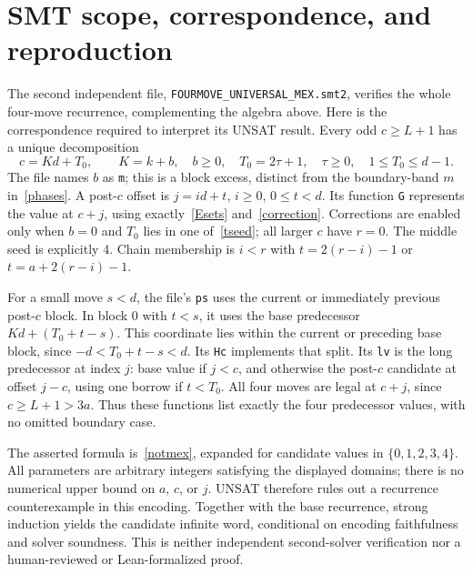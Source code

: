 \documentclass[10pt,a4paper]{article}
\begin{document}
\section{SMT scope, correspondence, and reproduction}
The second independent file, \texttt{FOURMOVE\_UNIVERSAL\_MEX.smt2}, verifies the whole four-move recurrence, complementing the algebra above. Here is the correspondence required to interpret its UNSAT result.
Every odd $c\ge L+1$ has a unique decomposition
\[
 c=Kd+T_0,\qquad K=k+b,\quad b\ge0,\quad T_0=2\tau+1,\quad \tau\ge0,\quad 1\le T_0\le d-1.
\]
The file names $b$ as \texttt{m}; this is a block excess, distinct from the boundary-band $m$ in~\eqref{phases}. A post-$c$ offset is $j=id+t$, $i\ge0$, $0\le t<d$. Its function \texttt{G} represents the value at $c+j$, using exactly~\eqref{Esets} and~\eqref{correction}. Corrections are enabled only when $b=0$ and $T_0$ lies in one of~\eqref{tseed}; all larger $c$ have $r=0$. The middle seed is explicitly 4. Chain membership is $i<r$ with $t=2(r-i)-1$ or $t=a+2(r-i)-1$.

For a small move $s<d$, the file's \texttt{ps} uses the current or immediately previous post-$c$ block. In block 0 with $t<s$, it uses the base predecessor $Kd+(T_0+t-s)$. This coordinate lies within the current or preceding base block, since $-d<T_0+t-s<d$. Its \texttt{Hc} implements that split. Its \texttt{lv} is the long predecessor at index $j$: base value if $j<c$, and otherwise the post-$c$ candidate at offset $j-c$, using one borrow if $t<T_0$. All four moves are legal at $c+j$, since $c\ge L+1>3a$. Thus these functions list exactly the four predecessor values, with no omitted boundary case.

The asserted formula is~\eqref{notmex}, expanded for candidate values in $\{0,1,2,3,4\}$. All parameters are arbitrary integers satisfying the displayed domains; there is no numerical upper bound on $a$, $c$, or $j$. UNSAT therefore rules out a recurrence counterexample in this encoding. Together with the base recurrence, strong induction yields the candidate infinite word, conditional on encoding faithfulness and solver soundness. This is neither independent second-solver verification nor a human-reviewed or Lean-formalized proof.
\end{document}
